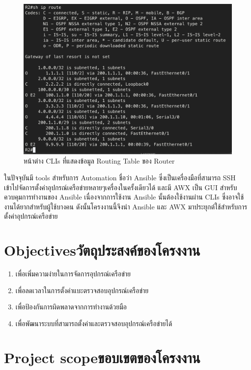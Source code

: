   \begin{figure}[h]
    \begin{center}
      \includegraphics[scale=0.4]{shRoute.png}
    \end{center}
    \caption[หน้าต่าง CLIs ที่แสดงข้อมูล Routing Table ของ Router]{หน้าต่าง CLIs ที่แสดงข้อมูล Routing Table ของ Router}
    \label{fig:shRoute}
  \end{figure}
  \hspace{0.5in}
ในปัจจุบันมี tools สำหรับการ Automation ชื่อว่า Ansible ซึ่งเป็นเครื่องมือที่สามารถ SSH เข้าไปจัดการตั้งค่าอุปกรณ์เครือข่ายหลายๆเครื่องในครั้งเดียวได้ และมี AWX เป็น GUI สำหรับควบคุมการทำงานของ Ansible เนื่องจากการใช้งาน Ansible นั้นต้องใช้งานผ่าน CLIs ซึ่งอาจใช้งานได้ยากสำหรับผู้ใช้บางคน
ดังนั้นโครงงานนี้จึงนำ Ansible และ AWX มาประยุกต์ใช้สำหรับการตั้งค่าอุปกรณ์เครือข่าย
\section{\ifenglish Objectives\else วัตถุประสงค์ของโครงงาน\fi}
\begin{enumerate}
    \item {เพื่อเพิ่มความง่ายในการจัดการอุปกรณ์เครือข่าย}
    \item {เพื่อลดเวลาในการตั้งค่าแบะตรวจสอบอุปกรณ์เครือข่าย}
    \item {เพื่อป้องกันการผิดพลาดจากการทำงานด้วยมือ}
    \item {เพื่อพัฒนาระบบที่สามารถตั้งค่าและตรวจสอบอุปกรณ์เครือข่ายได้}
\end{enumerate}

\section{\ifenglish Project scope\else ขอบเขตของโครงงาน\fi}
